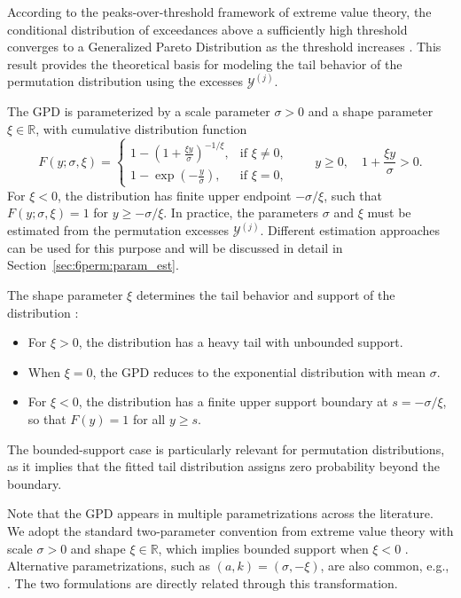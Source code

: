 According to the peaks-over-threshold framework of extreme value theory, the conditional distribution of exceedances above a sufficiently high threshold converges to a Generalized Pareto Distribution as the threshold increases \citep{pickands1975statistical,park2016estimating}. This result provides the theoretical basis for modeling the tail behavior of the permutation distribution using the excesses $\mathcal{Y}^{(j)}$.

The GPD is parameterized by a scale parameter $\sigma > 0$ and a shape parameter $\xi \in \mathbb{R}$, with cumulative distribution function
\begin{equation}
	\label{eq:6perm:GPD_CDF}
	F(y; \sigma, \xi) =
	\begin{cases}
		1 - \left(1 + \frac{\xi y}{\sigma} \right)^{-1/\xi}, & \text{if } \xi \neq 0, \\[6pt]
		1 - \exp\left(-\frac{y}{\sigma}\right), & \text{if } \xi = 0,
	\end{cases}
	\qquad y \geq 0,\quad 1+\frac{\xi y}{\sigma}>0.
\end{equation}
For $\xi<0$, the distribution has finite upper endpoint $-\sigma/\xi$, such that $F(y;\sigma,\xi)=1$ for $y\geq -\sigma/\xi$. In practice, the parameters $\sigma$ and $\xi$ must be estimated from the permutation excesses $\mathcal{Y}^{(j)}$. 
Different estimation approaches can be used for this purpose and will be discussed in detail in Section~\ref{sec:6perm:param_est}.

The shape parameter $\xi$ determines the tail behavior and support of the distribution \citep{hosking1987parameter}:
\begin{itemize}
    \item For $\xi>0$, the distribution has a heavy tail with unbounded support. 
    \item When $\xi=0$, the GPD reduces to the exponential distribution with mean $\sigma$.
    \item For $\xi<0$, the distribution has a finite upper support boundary at $s=-\sigma/\xi$, so that $F(y)=1$ for all $y \ge s$.
\end{itemize}
The bounded-support case is particularly relevant for permutation distributions, as it implies that the fitted tail distribution assigns zero probability beyond the boundary.

Note that the GPD appears in multiple parametrizations across the literature. We adopt the standard two-parameter convention from extreme value theory with scale $\sigma>0$ and shape $\xi\in\mathbb{R}$, which implies bounded support when $\xi<0$ \citep{coles2001introduction}. Alternative parametrizations, such as $(a,k)=(\sigma,-\xi)$, are also common, e.g., \citep{castillo2015likelihood}. The two formulations are directly related through this transformation.

